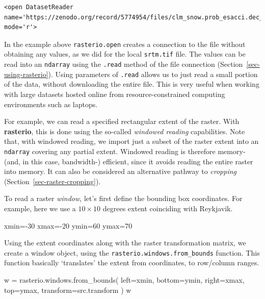\documentclass[
  letterpaper,
]{krantz}
\newenvironment{Shaded}{\begin{snugshade}}{\end{snugshade}}
\newcommand{\DecValTok}[1]{\textcolor[rgb]{0.68,0.00,0.00}{#1}}
\newcommand{\NormalTok}[1]{\textcolor[rgb]{0.00,0.23,0.31}{#1}}
\newcommand{\OperatorTok}[1]{\textcolor[rgb]{0.37,0.37,0.37}{#1}}
\begin{document}
\begin{verbatim}
<open DatasetReader name='https://zenodo.org/record/5774954/files/clm_snow.prob_esacci.dec_p.90_500m_s0..0cm_2000..2012_v2.0.tif' mode='r'>
\end{verbatim}

In the example above \texttt{rasterio.open} creates a connection to the
file without obtaining any values, as we did for the local
\texttt{srtm.tif} file. The values can be read into an \texttt{ndarray}
using the \texttt{.read} method of the file connection
(Section~\ref{sec-using-rasterio}). Using parameters of \texttt{.read}
allows us to just read a small portion of the data, without downloading
the entire file. This is very useful when working with large datasets
hosted online from resource-constrained computing environments such as
laptops.

For example, we can read a specified rectangular extent of the raster.
With \textbf{rasterio}, this is done using the so-called \emph{windowed
reading} capabilities. Note that, with windowed reading, we import just
a subset of the raster extent into an \texttt{ndarray} covering any
partial extent. Windowed reading is therefore memory- (and, in this
case, bandwidth-) efficient, since it avoids reading the entire raster
into memory. It can also be considered an alternative pathway to
\emph{cropping} (Section~\ref{sec-raster-cropping}).

To read a raster \emph{window}, let's first define the bounding box
coordinates. For example, here we use a \(10 \times 10\) degrees extent
coinciding with Reykjavik.

\begin{Shaded}
\begin{Highlighting}[]
\NormalTok{xmin}\OperatorTok{={-}}\DecValTok{30}
\NormalTok{xmax}\OperatorTok{={-}}\DecValTok{20}
\NormalTok{ymin}\OperatorTok{=}\DecValTok{60}
\NormalTok{ymax}\OperatorTok{=}\DecValTok{70}
\end{Highlighting}
\end{Shaded}

Using the extent coordinates along with the raster transformation
matrix, we create a window object, using the
\texttt{rasterio.windows.from\_bounds} function. This function basically
`translates' the extent from coordinates, to row/column ranges.

\begin{Shaded}
\begin{Highlighting}[]
\NormalTok{w }\OperatorTok{=}\NormalTok{ rasterio.windows.from\_bounds(}
\NormalTok{    left}\OperatorTok{=}\NormalTok{xmin, }
\NormalTok{    bottom}\OperatorTok{=}\NormalTok{ymin,}
\NormalTok{    right}\OperatorTok{=}\NormalTok{xmax,}
\NormalTok{    top}\OperatorTok{=}\NormalTok{ymax, }
\NormalTok{    transform}\OperatorTok{=}\NormalTok{src.transform}
\NormalTok{)}
\NormalTok{w}
\end{Highlighting}
\end{Shaded}
\end{document}
